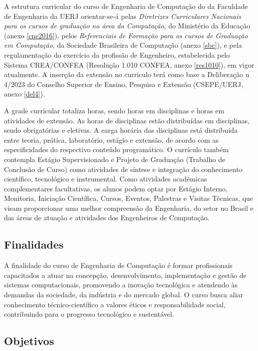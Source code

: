 A estrutura curricular do curso de Engenharia de Computação do \desc da Faculdade de Engenharia da UERJ orientar-se-á pelas \textit{Diretrizes Curriculares Nacionais para os cursos de graduação na área da Computação}, do Ministério da Educação (anexo \ref{cne2016}), pelos \textit{Referenciais de Formação para os cursos de Graduação em Computação}, da Sociedade Brasileira de Computação (anexo \ref{sbc}), e pela regulamentação do exercício da profissão de Engenheiro, estabelecida pelo Sistema CREA/CONFEA (Resolução 1.010 CONFEA, anexo \ref{res1010}), em vigor atualmente. A inserção da extensão no curriculo terá como base a Deliberação n\textordmasculine{} 4/2023 do Conselho Superior de Ensino, Pesquisa e Extensão (CSEPE/UERJ, anexo \ref{del4}).

A grade curricular totaliza \totalhoras horas, sendo \hobrigatorias horas em disciplinas e \hextensao horas em atividades de extensão. As \hobrigatorias horas de disciplinas estão distribuídas em \ndisciplinas disciplinas, sendo \nobrigatorias  obrigatórias e \neletivas eletivas. A carga horária das disciplinas está distribuída entre teoria, prática, laboratório, estágio e extensão, de acordo com as especificidades do respectivo conteúdo programático. O currículo também contempla Estágio Supervisionado e Projeto de Graduação (Trabalho de Conclusão de Curso) como atividades de síntese e integração do conhecimento científico, tecnológico e instrumental. Como atividades acadêmicas complementares facultativas, os alunos podem optar por Estágio Interno, Monitoria, Iniciação Científica, Cursos, Eventos, Palestras e Visitas Técnicas, que visam proporcionar uma melhor compreensão da Engenharia, do setor no Brasil e das áreas de atuação e atividades dos Engenheiros de Computação.

\subsection{Finalidades}

A finalidade do curso de Engenharia de Computação é formar profissionais capacitados a atuar na concepção, desenvolvimento, implementação e gestão de sistemas computacionais, promovendo a inovação tecnológica e atendendo às demandas da sociedade, da indústria e do mercado global. O curso busca aliar conhecimento técnico-científico a valores éticos e responsabilidade social, contribuindo para o progresso tecnológico e sustentável.

\subsection{Objetivos}

